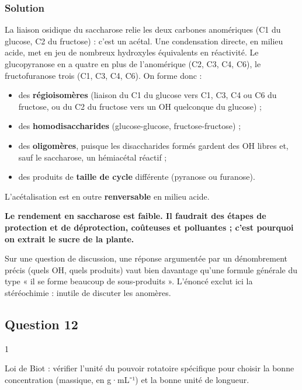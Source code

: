 \documentclass[11pt,a4paper]{article}
\providecommand{\tightlist}{\setlength{\itemsep}{0pt}\setlength{\parskip}{0pt}}
\begin{document}
\hypertarget{solution-10}{%
\subsubsection{Solution}\label{solution-10}}

La liaison osidique du saccharose relie les deux carbones anomériques (C1 du glucose, C2 du fructose) : c'est un acétal. Une condensation directe, en milieu acide, met en jeu de nombreux hydroxyles équivalents en réactivité. Le glucopyranose en a quatre en plus de l'anomérique (C2, C3, C4, C6), le fructofuranose trois (C1, C3, C4, C6). On forme donc :

\begin{itemize}
\tightlist
\item
  des \textbf{régioisomères} (liaison du C1 du glucose vers C1, C3, C4 ou C6 du fructose, ou du C2 du fructose vers un OH quelconque du glucose) ;
\item
  des \textbf{homodisaccharides} (glucose-glucose, fructose-fructose) ;
\item
  des \textbf{oligomères}, puisque les disaccharides formés gardent des OH libres et, sauf le saccharose, un hémiacétal réactif ;
\item
  des produits de \textbf{taille de cycle} différente (pyranose ou furanose).
\end{itemize}

L'acétalisation est en outre \textbf{renversable} en milieu acide.

\textbf{Le rendement en saccharose est faible. Il faudrait des étapes de protection et de déprotection, coûteuses et polluantes ; c'est pourquoi on extrait le sucre de la plante.}

\begin{jury}

Sur une question de discussion, une réponse argumentée par un dénombrement précis (quels OH, quels produits) vaut bien davantage qu'une formule générale du type « il se forme beaucoup de sous-produits ». L'énoncé exclut ici la stéréochimie : inutile de discuter les anomères.

\end{jury}

\hypertarget{question-12}{%
\subsection{Question 12}\label{question-12}}

\begin{indication}{1}

Loi de Biot : vérifier l'unité du pouvoir rotatoire spécifique pour choisir la bonne concentration (massique, en g·mL⁻¹) et la bonne unité de longueur.

\end{indication}
\end{document}
